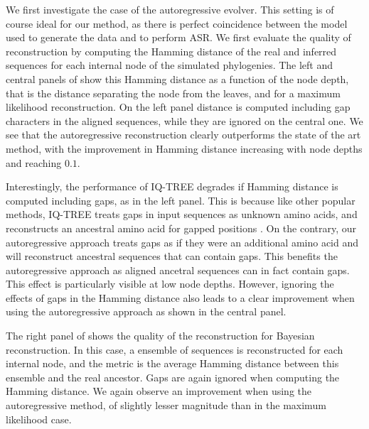 We first investigate the case of the autoregressive evolver. 
This setting is of course ideal for our method, as there is perfect coincidence between the model used to generate the data and to perform ASR. 
We first evaluate the quality of reconstruction by computing the Hamming distance of the real and inferred sequences for each internal node of the simulated phylogenies. 
The left and central panels of  show this Hamming distance as a function of the node depth, that is the distance separating the node from the leaves, and for a maximum likelihood reconstruction. 
On the left panel distance is computed including gap characters in the aligned sequences, while they are ignored on the central one. 
We see that the autoregressive reconstruction clearly outperforms the state of the art method, with the improvement in Hamming distance increasing with node depths and reaching $0.1$. 

Interestingly, the performance of IQ-TREE degrades if Hamming distance is computed including gaps, as in the left panel. 
This is because like other popular methods, IQ-TREE treats gaps in input sequences as unknown amino acids, and reconstructs an ancestral amino acid for gapped positions \cite{yang_pamlphylogeneticanalysis_2007,minh_iqtreenewmodels_2020}. 
On the contrary, our autoregressive approach treats gaps as if they were an additional amino acid and will reconstruct ancestral sequences that can contain gaps. 
This benefits the autoregressive approach as aligned ancetral sequences can in fact contain gaps.
This effect is particularly visible at low node depths. 
However, ignoring the effects of gaps in the Hamming distance also leads to a clear improvement when using the autoregressive approach as shown in the central panel. 

The right panel of  shows the quality of the reconstruction for Bayesian reconstruction. 
In this case, a ensemble of sequences is reconstructed for each internal node, and the metric is the average Hamming distance between this ensemble and the real ancestor. 
Gaps are again ignored when computing the Hamming distance. 
We again observe an improvement when using the autoregressive method, of slightly lesser magnitude than in the maximum likelihood case. \\


